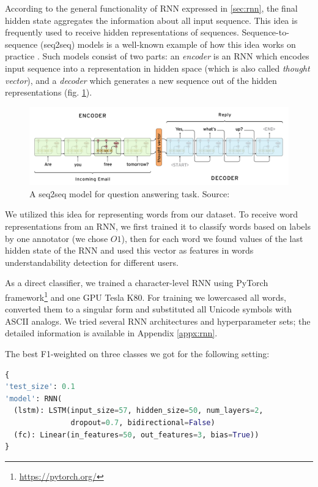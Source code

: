 According to the general functionality of RNN expressed in \ref{sec:rnn}, the final hidden state aggregates the information about all input sequence. This idea is frequently used to receive hidden representations of sequences. Sequence-to-sequence (seq2seq) models is a well-known example of how this idea works on practice \citep{Sutskever-NIPS2014}. Such models consist of two parts: an \textit{encoder} is an RNN which encodes input sequence into a representation in hidden space (which is also called \textit{thought vector}), and a \textit{decoder} which generates a new sequence out of the hidden representations (fig. \ref{fig:seq2seq}). 

\begin{figure}[h]
    \centering
    \includegraphics[width=14cm]{Images/seq2seq.png}
    \caption{A seq2seq model for question answering task. Source: \citep{Britz-2016}}
    \label{fig:seq2seq}
\end{figure} 

We utilized this idea for representing words from our dataset. To receive word representations from an RNN, we first trained it to classify words based on labels by one annotator (we chose $O1$), then for each word we found values of the last hidden state of the RNN and used this vector as features in words understandability detection for different users.

As a direct classifier, we trained a character-level RNN using PyTorch framework\footnote{\url{https://pytorch.org/}} and one GPU Tesla K80. For training we lowercased all words, converted them to a singular form and substituted all Unicode symbols with ASCII analogs.  We tried several RNN architectures and hyperparameter sets; the detailed information is available in Appendix \ref{appx:rnn}. 


The best F1-weighted on three classes we got for the following setting:

\begin{lstlisting}[language=Python]
{
'test_size': 0.1
'model': RNN(
  (lstm): LSTM(input_size=57, hidden_size=50, num_layers=2,
               dropout=0.7, bidirectional=False)
  (fc): Linear(in_features=50, out_features=3, bias=True))
}
\end{lstlisting}

